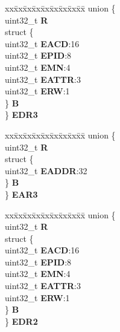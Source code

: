 \begin{DoxyCompactItemize}
\begin{tabbing}
\end{tabbing}\item 
\mbox{\label{structMPU__tag_a571b8a180c4f22fd6ff405089f4c28b4}} 
\begin{tabbing}
xx\=xx\=xx\=xx\=xx\=xx\=xx\=xx\=xx\=\kill
union \{\\
\>uint32\_t {\bfseries R}\\
\>struct \{\\
\>\>uint32\_t {\bfseries EACD}:16\\
\>\>uint32\_t {\bfseries EPID}:8\\
\>\>uint32\_t {\bfseries EMN}:4\\
\>\>uint32\_t {\bfseries EATTR}:3\\
\>\>uint32\_t {\bfseries ERW}:1\\
\>\} {\bfseries B}\\
\} {\bfseries EDR3}\\

\end{tabbing}\item 
\mbox{\label{structMPU__tag_a632f838389ccfa10ae643ef37a957d83}} 
\begin{tabbing}
xx\=xx\=xx\=xx\=xx\=xx\=xx\=xx\=xx\=\kill
union \{\\
\>uint32\_t {\bfseries R}\\
\>struct \{\\
\>\>uint32\_t {\bfseries EADDR}:32\\
\>\} {\bfseries B}\\
\} {\bfseries EAR3}\\

\end{tabbing}\item 
\mbox{\label{structMPU__tag_a2ffdeb0b8c494eb7eb6b16e1d12d9c91}} 
\begin{tabbing}
xx\=xx\=xx\=xx\=xx\=xx\=xx\=xx\=xx\=\kill
union \{\\
\>uint32\_t {\bfseries R}\\
\>struct \{\\
\>\>uint32\_t {\bfseries EACD}:16\\
\>\>uint32\_t {\bfseries EPID}:8\\
\>\>uint32\_t {\bfseries EMN}:4\\
\>\>uint32\_t {\bfseries EATTR}:3\\
\>\>uint32\_t {\bfseries ERW}:1\\
\>\} {\bfseries B}\\
\} {\bfseries EDR2}\\


\end{tabbing}
\end{DoxyCompactItemize}
